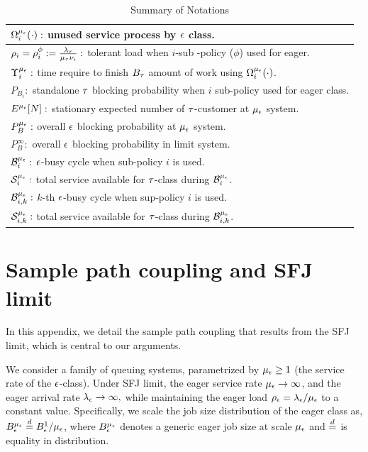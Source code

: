 \begin{table}[]
\begin{center}
\begin{tabular}{|l|}
			$\Omega_i^{\mu_\epsilon} (\cdot):$ unused service process by ${ \epsilon }$ class. 
			\\ \hline
			$\rho_{i}  =  \rho^\phi_i   := \frac{\lambda_{{\tau}}}{{\mu_\tau} \nu_i} : $ tolerant load when $i$-sub -policy ($\phi$)  used for eager. 
			\\ \hline 
			$\Upsilon_i^{\mu_\epsilon} : $ time require to finish $B_{\tau}$ amount of work using $\Omega_i^{\mu_\epsilon} (\cdot)$. 
			\\ \hline
			$P_{B_i} :$ standalone ${\tau}$ blocking probability when $i$ sub-policy used for eager class. 
			\\ \hline
			$E^{\mu_\epsilon}[N] :$ stationary expected number of ${\tau}$-customer at ${\mu_\epsilon}$ system.
			\\ \hline
		    $P_B^{\mu_\epsilon} :$ overall ${ \epsilon }$ blocking probability at ${\mu_\epsilon}$ system. 
		    \\ \hline
		    $P_B^\infty :$ overall ${ \epsilon }$ blocking probability in limit system.
			\\ \hline
			$\mathcal{B}^{\mu_\epsilon}_i :$ ${ \epsilon }$-busy cycle when sub-policy $i$ is used.
			\\ \hline
			$\mathcal{S}^{\mu_\epsilon}_i :$ total service available for ${\tau}$-class during $\mathcal{B}^{\mu_\epsilon}_i$.
			\\ \hline
			$\mathcal{B}^{\mu_\epsilon}_{i,k} :$ $k$-th ${ \epsilon }$-busy cycle when sup-policy $i$ is used. 
			\\ \hline
			$\mathcal{S}^{\mu_\epsilon}_{i,k} :$ total service available for ${\tau}$-class during $\mathcal{B}^{\mu_\epsilon}_{i,k}$.
			\\ \hline
		\end{tabular}
		\caption{Summary of Notations   \label{Table_notations}}
	\end{center}
\end{table}


\section{Sample path coupling   and  SFJ limit}
\label{Appendix_sample}
\label{sec:SFJ_scale_details}
 

In this appendix, we detail the sample path coupling that results from
the SFJ limit, which is central to our arguments.

We consider a family of queuing systems,
parametrized by ${\mu_\epsilon} \geq 1$ (the service rate of the ${ \epsilon }$-class).
Under SFJ limit, the eager service rate ${\mu_\epsilon} \to \infty$, and the
eager arrival rate $\lambda_{ \epsilon } \rightarrow \infty,$ while maintaining the
eager load $\rho_{ \epsilon } = \lambda_{ \epsilon } / \mu_{ \epsilon }$ to a constant value.
Specifically, we scale the job size distribution of the eager class
as, $B^{\mu_{ \epsilon }}_{ \epsilon } \stackrel{d}{=} B^1_{ \epsilon }/\mu_{{ \epsilon }}$, where $B^{\mu_{ \epsilon }}_{ \epsilon }$
denotes a generic eager job size at scale $\mu_{ \epsilon }$ and $\stackrel{d}{=}$ is
equality in distribution.

